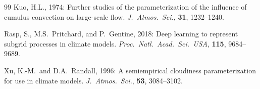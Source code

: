 \documentclass[11pt,a4paper]{article}
\begin{document}
\begin{thebibliography}{99}
Kuo, H.L., 1974:
Further studies of the parameterization of the influence of cumulus
convection on large-scale flow.
\textit{J.\ Atmos.\ Sci.}, \textbf{31}, 1232--1240.

Rasp, S., M.S.~Pritchard, and P.~Gentine, 2018:
Deep learning to represent subgrid processes in climate models.
\textit{Proc.\ Natl.\ Acad.\ Sci.\ USA}, \textbf{115}, 9684--9689.

Xu, K.-M.\ and D.A.~Randall, 1996:
A semiempirical cloudiness parameterization for use in climate models.
\textit{J.\ Atmos.\ Sci.}, \textbf{53}, 3084--3102.

\end{thebibliography}
\end{document}
